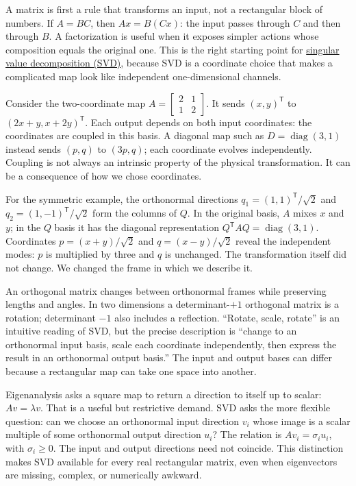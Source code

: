 A matrix is first a rule that transforms an input, not a rectangular block of numbers. If \(A=BC\), then \(Ax=B(Cx)\): the input passes through \(C\) and then through \(B\). A factorization is useful when it exposes simpler actions whose composition equals the original one. This is the right starting point for \hyperref[02-foundations-ii-ch024-full-thin-and-compact-shapes-for-tall-and-wide-matrices]{singular value decomposition (SVD)}, because SVD is a coordinate choice that makes a complicated map look like independent one-dimensional channels.

Consider the two-coordinate map \(A=\begin{bmatrix}2&1\\1&2\end{bmatrix}\). It sends \((x,y)^\mathsf T\) to \((2x+y,x+2y)^\mathsf T\). Each output depends on both input coordinates: the coordinates are coupled in this basis. A diagonal map such as \(D=\operatorname{diag}(3,1)\) instead sends \((p,q)\) to \((3p,q)\); each coordinate evolves independently. Coupling is not always an intrinsic property of the physical transformation. It can be a consequence of how we chose coordinates.

For the symmetric example, the orthonormal directions \(q_1=(1,1)^\mathsf T/\sqrt2\) and \(q_2=(1,-1)^\mathsf T/\sqrt2\) form the columns of \(Q\). In the original basis, \(A\) mixes \(x\) and \(y\); in the \(Q\) basis it has the diagonal representation \(Q^\mathsf T A Q=\operatorname{diag}(3,1)\). Coordinates \(p=(x+y)/\sqrt2\) and \(q=(x-y)/\sqrt2\) reveal the independent modes: \(p\) is multiplied by three and \(q\) is unchanged. The transformation itself did not change. We changed the frame in which we describe it.

An orthogonal matrix changes between orthonormal frames while preserving lengths and angles. In two dimensions a determinant-\(+1\) orthogonal matrix is a rotation; determinant \(-1\) also includes a reflection. ``Rotate, scale, rotate'' is an intuitive reading of SVD, but the precise description is ``change to an orthonormal input basis, scale each coordinate independently, then express the result in an orthonormal output basis.'' The input and output bases can differ because a rectangular map can take one space into another.

Eigenanalysis asks a square map to return a direction to itself up to scalar: \(Av=\lambda v\). That is a useful but restrictive demand. SVD asks the more flexible question: can we choose an orthonormal input direction \(v_i\) whose image is a scalar multiple of some orthonormal output direction \(u_i\)? The relation is \(Av_i=\sigma_i u_i\), with \(\sigma_i\ge0\). The input and output directions need not coincide. This distinction makes SVD available for every real rectangular matrix, even when eigenvectors are missing, complex, or numerically awkward.

